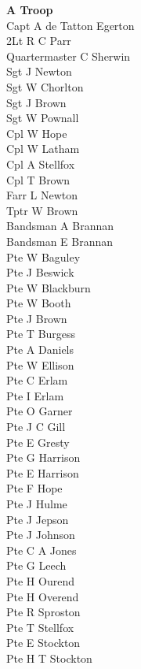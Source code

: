 \begin{multicols}{3}
  \small
  \noindent
  \textbf{A Troop} \\
  Capt A de Tatton Egerton \\
  2Lt R C Parr \\
  Quartermaster C Sherwin \\
  Sgt J Newton \\
  Sgt W Chorlton \\
  Sgt J Brown \\
  Sgt W Pownall \\
  Cpl W Hope \\
  Cpl W Latham \\
  Cpl A Stellfox \\
  Cpl T Brown \\
  Farr L Newton \\
  Tptr W Brown \\
  Bandsman A Brannan \\
  Bandsman E Brannan \\
  Pte W Baguley \\
  Pte J Beswick \\
  Pte W Blackburn \\
  Pte W Booth \\
  Pte J Brown \\
  Pte T Burgess \\
  Pte A Daniels \\
  Pte W Ellison \\
  Pte C Erlam \\
  Pte I Erlam \\
  Pte O Garner \\
  Pte J C Gill \\
  Pte E Gresty \\
  Pte G Harrison \\
  Pte E Harrison \\
  Pte F Hope \\
  Pte J Hulme \\
  Pte J Jepson \\
  Pte J Johnson \\
  Pte C A Jones \\
  Pte G Leech \\
  Pte H Ourend \\
  Pte H Overend \\
  Pte R Sproston \\
  Pte T Stellfox \\
  Pte E Stockton \\
  Pte H T Stockton \\

\end{multicols}

